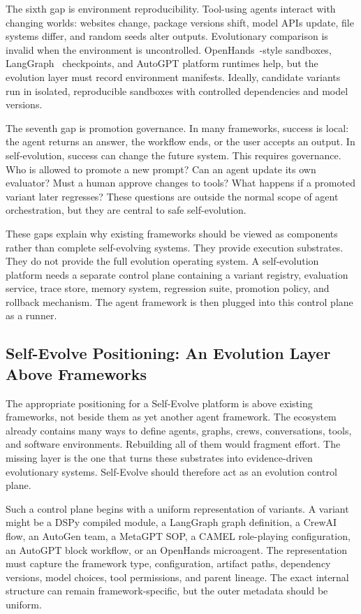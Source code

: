 The sixth gap is environment reproducibility.  Tool-using agents interact with changing worlds: websites change, package versions shift, model APIs update, file systems differ, and random seeds alter outputs.  Evolutionary comparison is invalid when the environment is uncontrolled.  OpenHands~\cite{openhands2024}-style sandboxes, LangGraph~\cite{langgraph2024} checkpoints, and AutoGPT platform runtimes help, but the evolution layer must record environment manifests.  Ideally, candidate variants run in isolated, reproducible sandboxes with controlled dependencies and model versions.

The seventh gap is promotion governance.  In many frameworks, success is local: the agent returns an answer, the workflow ends, or the user accepts an output.  In self-evolution, success can change the future system.  This requires governance.  Who is allowed to promote a new prompt?  Can an agent update its own evaluator?  Must a human approve changes to tools?  What happens if a promoted variant later regresses?  These questions are outside the normal scope of agent orchestration, but they are central to safe self-evolution.

These gaps explain why existing frameworks should be viewed as components rather than complete self-evolving systems.  They provide execution substrates.  They do not provide the full evolution operating system.  A self-evolution platform needs a separate control plane containing a variant registry, evaluation service, trace store, memory system, regression suite, promotion policy, and rollback mechanism.  The agent framework is then plugged into this control plane as a runner.

\subsection{Self-Evolve Positioning: An Evolution Layer Above Frameworks}
\label{subsec:self-evolve-positioning}

The appropriate positioning for a Self-Evolve platform is above existing frameworks, not beside them as yet another agent framework.  The ecosystem already contains many ways to define agents, graphs, crews, conversations, tools, and software environments.  Rebuilding all of them would fragment effort.  The missing layer is the one that turns these substrates into evidence-driven evolutionary systems.  Self-Evolve should therefore act as an evolution control plane.

Such a control plane begins with a uniform representation of variants.  A variant might be a DSPy compiled module, a LangGraph graph definition, a CrewAI flow, an AutoGen team, a MetaGPT SOP, a CAMEL role-playing configuration, an AutoGPT block workflow, or an OpenHands microagent.  The representation must capture the framework type, configuration, artifact paths, dependency versions, model choices, tool permissions, and parent lineage.  The exact internal structure can remain framework-specific, but the outer metadata should be uniform.

